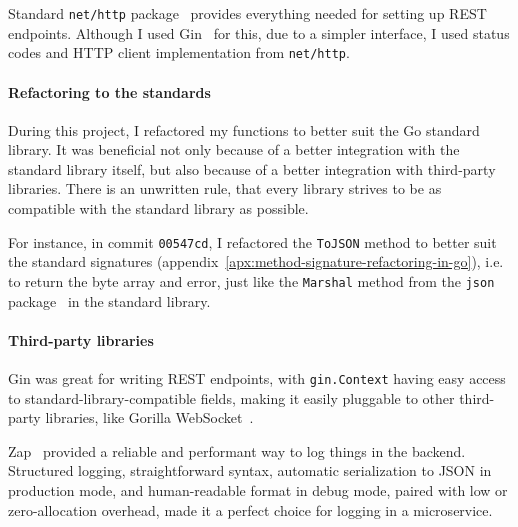 Standard \texttt{net/http} package~\cite{cox_http_2022} provides everything
needed for setting up \ac{REST} endpoints.
Although I used Gin~\cite{martinez-almeida_gin_2022} for this,
due to a simpler interface,
I used status codes
and \ac{HTTP} client implementation
from \texttt{net/http}.

\paragraph*{Refactoring to the standards}\label{sec:refactoring-to-the-standards}

During this project,
I refactored my functions to better suit
the Go standard library.
It was beneficial
not only because of a better integration
with the standard library itself,
but also because of a better integration
with third-party libraries.
There is an unwritten rule,
that every library strives
to be as compatible
with the standard library as possible.

For instance,
in commit \texttt{00547cd},
I refactored the \texttt{ToJSON} method
to better suit the standard signatures
(appendix~\ref{apx:method-signature-refactoring-in-go}),
i.e. to return the byte array and error,
just like the \texttt{Marshal} method
from the \texttt{json} package~\cite{cox_json_2022}
in the standard library.

\paragraph*{Third-party libraries}\label{sec:third-party-libraries}

Gin was great for writing \ac{REST} endpoints,
with \texttt{gin.Con\-text} having easy access to
standard-library-compatible fields,
making it easily pluggable to other third-party libraries,
like Gorilla WebSocket~\cite{burd_gorilla_2022}.

Zap~\cite{shah_zap_2022} provided a reliable
and performant way to log things in the backend.
Structured logging,
straightforward syntax,
automatic serialization to \ac{JSON} in production mode,
and human-readable format in debug mode,
paired with low or zero-allocation overhead,
made it a perfect choice for logging in a microservice.

